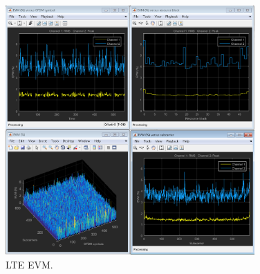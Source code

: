 \begin{figure}[htbp]
    \centering
    \includegraphics[width=0.85\textwidth]{./figures/evm}
    \caption{ LTE EVM.
    \label{fig:lteevmiio}}
\end{figure}

\vfill
\clearpage
